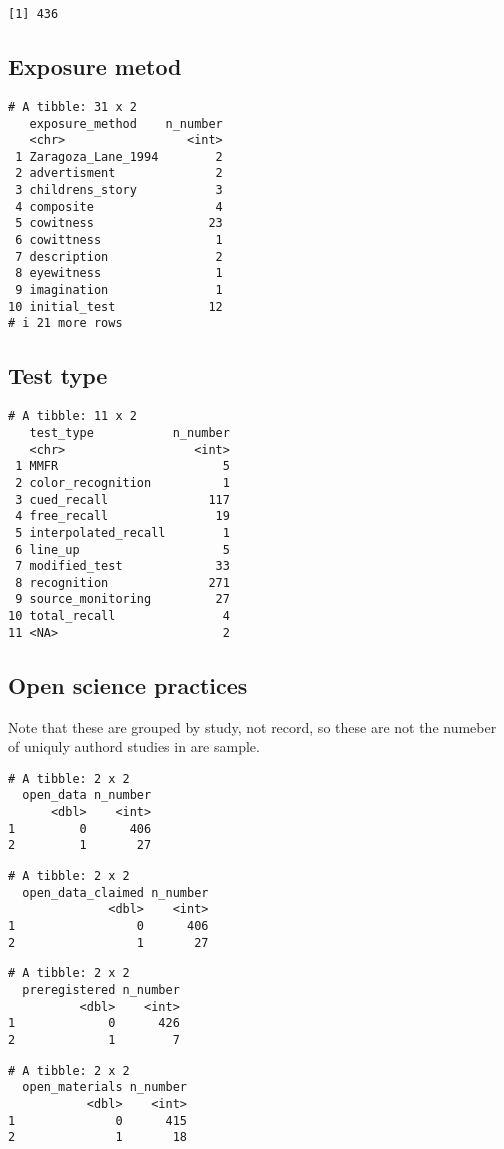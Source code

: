 \documentclass[
  letterpaper,
  DIV=11,
  numbers=noendperiod]{scrartcl}
\begin{document}
\begin{verbatim}
[1] 436
\end{verbatim}

\hypertarget{exposure-metod}{%
\subsection{Exposure metod}\label{exposure-metod}}

\begin{verbatim}
# A tibble: 31 x 2
   exposure_method    n_number
   <chr>                 <int>
 1 Zaragoza_Lane_1994        2
 2 advertisment              2
 3 childrens_story           3
 4 composite                 4
 5 cowitness                23
 6 cowittness                1
 7 description               2
 8 eyewitness                1
 9 imagination               1
10 initial_test             12
# i 21 more rows
\end{verbatim}

\hypertarget{test-type}{%
\subsection{Test type}\label{test-type}}

\begin{verbatim}
# A tibble: 11 x 2
   test_type           n_number
   <chr>                  <int>
 1 MMFR                       5
 2 color_recognition          1
 3 cued_recall              117
 4 free_recall               19
 5 interpolated_recall        1
 6 line_up                    5
 7 modified_test             33
 8 recognition              271
 9 source_monitoring         27
10 total_recall               4
11 <NA>                       2
\end{verbatim}

\hypertarget{open-science-practices}{%
\subsection{Open science practices}\label{open-science-practices}}

Note that these are grouped by study, not record, so these are not the
numeber of uniquly authord studies in are sample.

\begin{verbatim}
# A tibble: 2 x 2
  open_data n_number
      <dbl>    <int>
1         0      406
2         1       27
\end{verbatim}

\begin{verbatim}
# A tibble: 2 x 2
  open_data_claimed n_number
              <dbl>    <int>
1                 0      406
2                 1       27
\end{verbatim}

\begin{verbatim}
# A tibble: 2 x 2
  preregistered n_number
          <dbl>    <int>
1             0      426
2             1        7
\end{verbatim}

\begin{verbatim}
# A tibble: 2 x 2
  open_materials n_number
           <dbl>    <int>
1              0      415
2              1       18
\end{verbatim}
\end{document}
